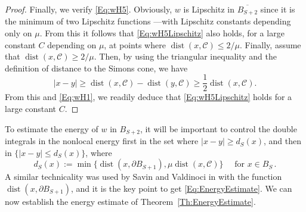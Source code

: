 \documentclass[12pt,reqno]{amsart}
\theoremstyle{definition}
\theoremstyle{remark}
\newcommand{\ccal}{\mathscr{C}}
\DeclareMathOperator{\dist}{dist}
\numberwithin{equation}{section}
\begin{document}
\begin{proof}
		Finally, we verify \eqref{Eq:wH5}. Obviously, $w$ is Lipschitz in $\overline{B_{S+2}}$ since it is the minimum of two Lipschitz functions ---with Lipschitz constants depending only on $\mu$. From this it follows that \eqref{Eq:wH5Lipschitz} also holds, for a large constant $C$ depending on $\mu$, at points where $\dist(x,\ccal)\leq 2/\mu$. Finally, assume that $\dist(x,\ccal)\geq 2/\mu$. Then, by using the triangular inequality and the definition of distance to the Simons cone, we have
		$$
		|x-y| \geq 	\dist(x,\ccal) - \dist(y,\ccal) \geq \dfrac{1}{2}\dist(x,\ccal).
		$$
		From this and \eqref{Eq:wH1}, we readily deduce that \eqref{Eq:wH5Lipschitz} holds for a large constant $C$.	
	\end{proof}
	
	
	
	To estimate the energy of $w$ in $B_{S+2}$, it will be important to control the double integrals in the nonlocal energy  first in the set where $|x-y|\geq d_S(x)$, and then in $\{|x-y|\leq d_S(x)\}$, where 
	$$ 
	d_S (x) 
	:= \min \{\dist(x, \partial B_{S+1}),\mu \dist(x,\ccal)\} \quad \text{ for } x\in B_S\,.
	$$
	A similar technicality was used by Savin and Valdinoci in \cite{SavinValdinoci-EnergyEstimate} with the function $\dist(x, \partial B_{S+1})$, and it is the key point to get \eqref{Eq:EnergyEstimate}. We can now establish the energy estimate of Theorem~\ref{Th:EnergyEstimate}. 
	
\end{document}
